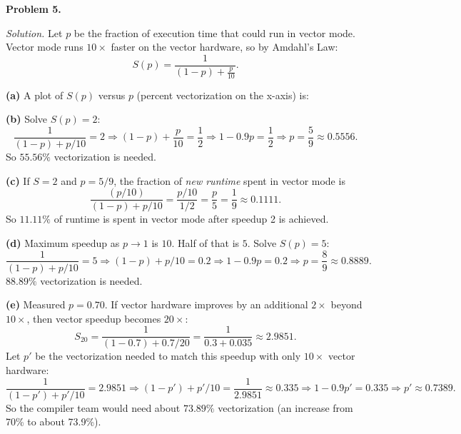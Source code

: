 \documentclass[12pt]{article}
\newcommand{\problem}[1]{\vspace{0.5em}\noindent\textbf{Problem #1.}\vspace{0.3em}}
\newenvironment{solution}{\par\noindent\textit{Solution.}}{\par\vspace{1em}}
\newcommand{\subproblem}[1]{\par\noindent\textbf{(#1)}\quad}
\begin{document}
\problem{5}
\begin{solution}
Let $p$ be the fraction of execution time that could run in vector mode. Vector mode runs $10\times$ faster on the vector hardware, so by Amdahl's Law:
\[
S(p)=\frac{1}{(1-p)+\frac{p}{10}}.
\]

\subproblem{a}
A plot of $S(p)$ versus $p$ (percent vectorization on the x-axis) is:

\begin{center}
\end{center}

\subproblem{b}
Solve $S(p)=2$:
\[
\frac{1}{(1-p)+p/10}=2
\Rightarrow (1-p)+\frac{p}{10}=\frac{1}{2}
\Rightarrow 1-0.9p=\frac{1}{2}
\Rightarrow p=\frac{5}{9}\approx 0.5556.
\]
So \(\boxed{55.56\%}\) vectorization is needed.

\subproblem{c}
If $S=2$ and $p=5/9$, the fraction of \emph{new runtime} spent in vector mode is
\[
\frac{(p/10)}{(1-p)+p/10}
=\frac{p/10}{1/2}
= \frac{p}{5}
=\frac{1}{9}\approx 0.1111.
\]
So \(\boxed{11.11\%}\) of runtime is spent in vector mode after speedup 2 is achieved.

\subproblem{d}
Maximum speedup as $p\to 1$ is $10$. Half of that is $5$.
Solve $S(p)=5$:
\[
\frac{1}{(1-p)+p/10}=5
\Rightarrow (1-p)+p/10=0.2
\Rightarrow 1-0.9p=0.2
\Rightarrow p=\frac{8}{9}\approx 0.8889.
\]
\(\boxed{88.89\%}\) vectorization is needed.

\subproblem{e}
Measured $p=0.70$. If vector hardware improves by an additional $2\times$ beyond $10\times$, then vector speedup becomes $20\times$:
\[
S_{20}=\frac{1}{(1-0.7)+0.7/20}=\frac{1}{0.3+0.035}\approx 2.9851.
\]
Let $p'$ be the vectorization needed to match this speedup with only $10\times$ vector hardware:
\[
\frac{1}{(1-p')+p'/10}=2.9851
\Rightarrow (1-p')+p'/10=\frac{1}{2.9851}\approx 0.335
\Rightarrow 1-0.9p'=0.335
\Rightarrow p'\approx 0.7389.
\]
So the compiler team would need about \(\boxed{73.89\%}\) vectorization (an increase from 70\% to about 73.9\%).

\end{solution}
\end{document}
